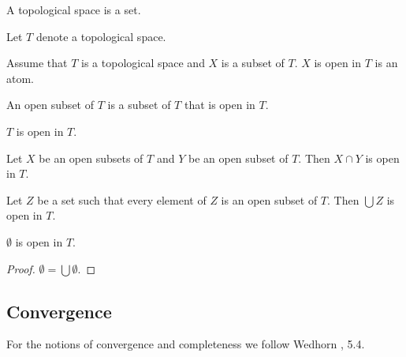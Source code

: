 \documentclass[11pt]{article}
\begin{document}
\begin{forthel}

\begin{signature}
A topological space is a set.
\end{signature}

Let $T$ denote a topological space.

\begin{signature} Assume that $T$ is a topological space and $X$ is a subset of $T$.
$X$ is open in $T$ is an atom.
\end{signature}

\begin{definition}
An open subset of $T$ is a subset of $T$ that is open in $T$.
\end{definition}

\begin{axiom} $T$ is open in $T$. \end{axiom}

\begin{axiom} Let $X$ be an open subsets of $T$ and $Y$ be an open subset of $T$.
Then $X \cap Y$ is open in $T$.
\end{axiom}

\begin{axiom} Let $Z$ be a set such that every element of $Z$
is an open subset of $T$. Then $\bigcup Z$ is open in $T$.
\end{axiom}

\begin{lemma} $\emptyset$ is open in $T$. \end{lemma}
\begin{proof} $\emptyset = \bigcup \emptyset$. \end{proof}

\end{forthel}
\subsection{Convergence}

For the notions of convergence and completeness we follow Wedhorn 
\cite{Wedhhorn2019}, 5.4.
\end{document}
